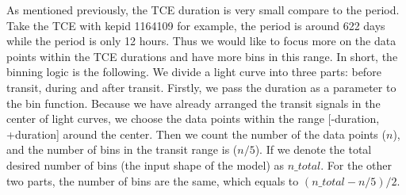       As mentioned previously, the TCE duration is very small compare to the period. 
      Take the TCE with kepid 1164109 for example, the period is around 622 days while 
      the period is only 12 hours. Thus we would like to focus more on the data points within 
      the TCE durations and have more bins in this range. In short, the binning logic is the 
      following. We divide a light curve into three parts: before transit, during and after 
      transit. Firstly, we pass the duration as a parameter to the bin function. Because 
      we have already arranged the transit signals in the center of light curves, 
      we choose the data points within the range [-duration, +duration] around the center.
      Then we count the number of the data points ($n$), and the number of bins in the 
      transit range is ($n/5$). If we denote the 
      total desired number of bins (the input shape of the model) as $n\_total$.
      For the other two parts, the number of bins are the same, which equals to 
      $\left(n\_total-n/5\right)/2$. 
      

      
